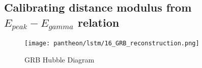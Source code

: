 \subsection{Calibrating distance modulus from $E_{peak}-E_{gamma}$ relation}
\begin{figure}[H]
	\centering
	\texttt{[image: pantheon/lstm/16\_GRB\_reconstruction.png]}
	\caption{GRB Hubble Diagram}
	\label{fig:HD_GRB_GP}
\end{figure}